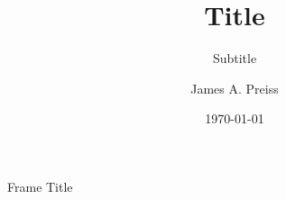 \documentclass[aspectratio=149,xcolor={dvipsnames}]{beamer}
\title{Title}
\subtitle{Subtitle}
\author{James A. Preiss}
\institute{University of Southern California}
\date{\monthyear\today}
\begin{document}
\frame{\titlepage}


\begin{frame}{Frame Title}
\end{frame}
\end{document}
